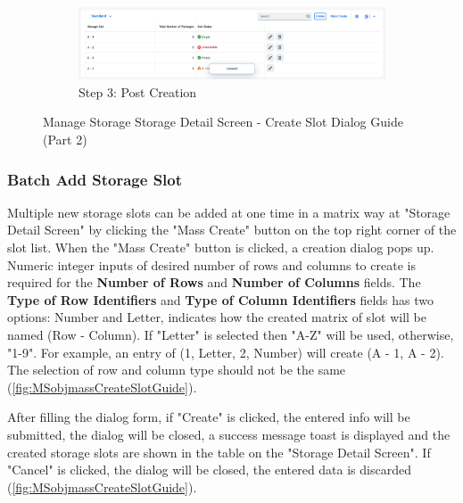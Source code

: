 \begin{figure}[htb]
    \ContinuedFloat
    \centering
    \begin{subfigure}{0.95\linewidth}
        \includegraphics[width=\linewidth]{images/user_doc/storage/updatedSlotEditDelete/singleSlotCreateToast.png}
        \caption{Step 3: Post Creation}
    \end{subfigure}
    
    \caption{Manage Storage Storage Detail Screen - Create Slot Dialog Guide (Part 2)}
    \label{fig:MSobjCreateSlotGuide2}
\end{figure}


\subsubsection{Batch Add Storage Slot}
\label{subsubsec:batchAddSlot}

Multiple new storage slots can be added at one time in a matrix way at "Storage Detail Screen" by clicking the "Mass Create" button on the top right corner of the slot list.
When the "Mass Create" button is clicked, a creation dialog pops up. Numeric integer inputs of desired number of rows and columns to create is required for the \textbf{Number of Rows} and \textbf{Number of Columns} fields. The \textbf{Type of Row Identifiers} and \textbf{Type of Column Identifiers} fields has two options: Number and Letter, indicates how the created matrix of slot will be named (Row - Column). If "Letter" is selected then "A-Z" will be used, otherwise, "1-9". For example, an entry of (1, Letter, 2, Number) will create (A - 1, A - 2). The selection of row and column type should not be the same (\autoref{fig:MSobjmassCreateSlotGuide}).

After filling the dialog form, if "Create" is clicked, the entered info will be submitted, the dialog will be closed, a success message toast is displayed and the created storage slots are shown in the table on the "Storage Detail Screen". If "Cancel" is clicked, the dialog will be closed, the entered data is discarded (\autoref{fig:MSobjmassCreateSlotGuide}).

